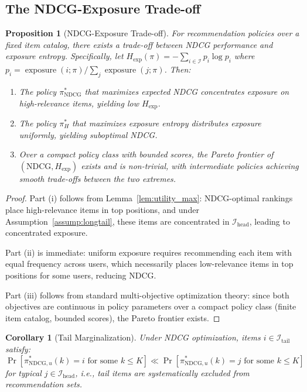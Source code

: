 \documentclass[11pt,a4paper]{article}
\theoremstyle{definition}
\theoremstyle{plain}
\newtheorem{proposition}[theorem]{Proposition}
\newtheorem{corollary}[theorem]{Corollary}
\theoremstyle{remark}
\newcommand{\NDCG}{\mathrm{NDCG}}
\DeclareMathOperator{\exposure}{exposure}
\begin{document}
\subsection{The NDCG-Exposure Trade-off}
\label{subsec:h1_tradeoff}

\begin{proposition}[NDCG-Exposure Trade-off]
\label{prop:ndcg_exposure}
For recommendation policies over a fixed item catalog, there exists a trade-off between NDCG performance and exposure entropy. Specifically, let $H_{\text{exp}}(\pi) = -\sum_{i \in \mathcal{I}} p_i \log p_i$ where $p_i = \exposure(i; \pi) / \sum_j \exposure(j; \pi)$. Then:
\begin{enumerate}[label=(\roman*)]
    \item The policy $\pi^*_{\NDCG}$ that maximizes expected NDCG concentrates exposure on high-relevance items, yielding low $H_{\text{exp}}$.
    \item The policy $\pi^*_H$ that maximizes exposure entropy distributes exposure uniformly, yielding suboptimal NDCG.
    \item Over a compact policy class with bounded scores, the Pareto frontier of $(\NDCG, H_{\text{exp}})$ exists and is non-trivial, with intermediate policies achieving smooth trade-offs between the two extremes.
\end{enumerate}
\end{proposition}

\begin{proof}
Part (i) follows from Lemma~\ref{lem:utility_max}: NDCG-optimal rankings place high-relevance items in top positions, and under Assumption~\ref{assump:longtail}, these items are concentrated in $\mathcal{I}_{\text{head}}$, leading to concentrated exposure.

Part (ii) is immediate: uniform exposure requires recommending each item with equal frequency across users, which necessarily places low-relevance items in top positions for some users, reducing NDCG.

Part (iii) follows from standard multi-objective optimization theory: since both objectives are continuous in policy parameters over a compact policy class (finite item catalog, bounded scores), the Pareto frontier exists.
\end{proof}

\begin{corollary}[Tail Marginalization]
\label{cor:tail_margin}
Under NDCG optimization, items $i \in \mathcal{I}_{\text{tail}}$ satisfy:
\begin{equation}
    \Pr[\pi^*_{\NDCG,u}(k) = i \text{ for some } k \leq K] \ll \Pr[\pi^*_{\NDCG,u}(k) = j \text{ for some } k \leq K]
\end{equation}
for typical $j \in \mathcal{I}_{\text{head}}$, i.e., tail items are systematically excluded from recommendation sets.
\end{corollary}
\end{document}
